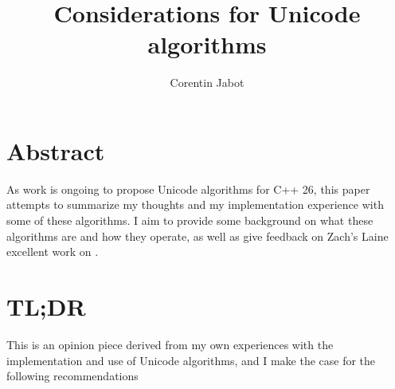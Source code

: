 \documentclass{wg21}
\title{Considerations for Unicode algorithms \emoji{🐛}}
\author{Corentin Jabot}{corentin.jabot@gmail.com}
\begin{document}
\maketitle

\section{Abstract}

As work is ongoing to propose Unicode algorithms for C++ 26, this paper attempts to summarize my thoughts and my implementation experience with some of these algorithms.
I aim to provide some background on what these algorithms are and how they operate, as well as give feedback on Zach's Laine excellent work on .

\section{TL;DR}

This is an opinion piece derived from my own experiences with the implementation and use of Unicode algorithms, and I make the case for the following recommendations
\end{document}
